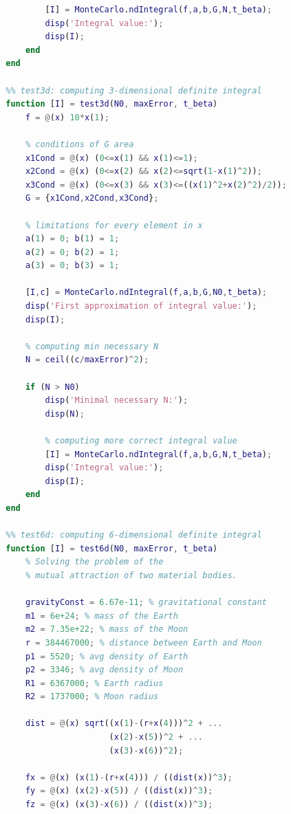 \documentclass[a4paper,12pt]{article}
\begin{document}
\begin{lstlisting}[language=MATLAB]
                % computing more correct integral value
                [I] = MonteCarlo.ndIntegral(f,a,b,G,N,t_beta);
                disp('Integral value:');
                disp(I);
            end
        end
        
        %% test3d: computing 3-dimensional definite integral
        function [I] = test3d(N0, maxError, t_beta)
            f = @(x) 10*x(1);
            
            % conditions of G area
            x1Cond = @(x) (0<=x(1) && x(1)<=1);
            x2Cond = @(x) (0<=x(2) && x(2)<=sqrt(1-x(1)^2));
            x3Cond = @(x) (0<=x(3) && x(3)<=((x(1)^2+x(2)^2)/2));
            G = {x1Cond,x2Cond,x3Cond};
            
            % limitations for every element in x
            a(1) = 0; b(1) = 1;
            a(2) = 0; b(2) = 1;
            a(3) = 0; b(3) = 1;
            
            [I,c] = MonteCarlo.ndIntegral(f,a,b,G,N0,t_beta);
            disp('First approximation of integral value:');
            disp(I);
            
            % computing min necessary N
            N = ceil((c/maxError)^2);
            
            if (N > N0)
                disp('Minimal necessary N:');
                disp(N);

                % computing more correct integral value
                [I] = MonteCarlo.ndIntegral(f,a,b,G,N,t_beta);
                disp('Integral value:');
                disp(I);
            end
        end

        %% test6d: computing 6-dimensional definite integral
        function [I] = test6d(N0, maxError, t_beta)
            % Solving the problem of the 
            % mutual attraction of two material bodies.
            
            gravityConst = 6.67e-11; % gravitational constant
            m1 = 6e+24; % mass of the Earth
            m2 = 7.35e+22; % mass of the Moon
            r = 384467000; % distance between Earth and Moon
            p1 = 5520; % avg density of Earth
            p2 = 3346; % avg density of Moon
            R1 = 6367000; % Earth radius
            R2 = 1737000; % Moon radius
            
            dist = @(x) sqrt((x(1)-(r+x(4)))^2 + ...
                             (x(2)-x(5))^2 + ...
                             (x(3)-x(6))^2);
            
            fx = @(x) (x(1)-(r+x(4))) / ((dist(x))^3);
            fy = @(x) (x(2)-x(5)) / ((dist(x))^3);
            fz = @(x) (x(3)-x(6)) / ((dist(x))^3);
            

\end{lstlisting}
\end{document}
